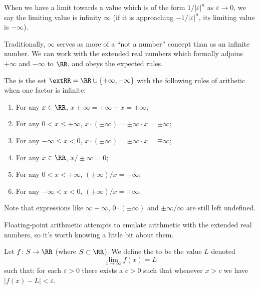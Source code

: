 \begin{node}\label{calculus-0005}%
When we have a limit towards a value which is of the form
$1/|\varepsilon|^{n}$ as $\varepsilon\to0$, we say the limiting value
is infinity $\infty$ (if it is approaching $-1/|\varepsilon|^{n}$, its limiting
value is $-\infty$).

\begin{node}[Infinity]\label{calculus:differential:limits-0002}%
Traditionally, $\infty$ serves as more of a ``not a number'' concept
than as an infinite number. We can work with the extended real numbers
which formally adjoins $+\infty$ and $-\infty$ to $\RR$, and obeys the
expected rules.



\begin{definition}\label{calculus:differential:limits-0003}%
The  is the set $\extRR=\RR\cup\{+\infty,-\infty\}$
with the following rules of arithetic when one factor is infinite:
\begin{enumerate}
\item For any $x\in\RR$, $x\pm\infty=\pm\infty+x=\pm\infty$;
\item For any $0<x\leq+\infty$, $x\cdot(\pm\infty)=\pm\infty\cdot x=\pm\infty$;
\item For any $-\infty\leq x<0$, $x\cdot(\pm\infty)=\pm\infty\cdot x=\mp\infty$;
\item For any $x\in\RR$, $x/\pm\infty=0$;
\item For any $0<x<+\infty$, $(\pm\infty)/x=\pm\infty$;
\item For any $-\infty<x<0$, $(\pm\infty)/x=\mp\infty$.
\end{enumerate}
Note that expressions like $\infty-\infty$, $0\cdot(\pm\infty)$ and
$\pm\infty/\infty$ are still left undefined.
\end{definition}

\begin{node}\label{calculus:differential:limits-0006}%
Floating-point arithmetic attempts to emulate arithmetic with the
extended real numbers, so it's worth knowing a little bit about them.
\end{node}
\end{node} %

\begin{definition}\label{calculus:differential:limits-0004}%
Let $f\colon S\to\RR$ (where $S\subset\RR$). We define the  to be the value $L$ denoted
\begin{equation*}
\lim_{x\to\infty}f(x)=L
\end{equation*}
such that: for each $\varepsilon>0$ there exists a $c>0$ such that
whenever $x>c$ we have $|f(x)-L|<\varepsilon$.
\end{definition}


\end{node}
